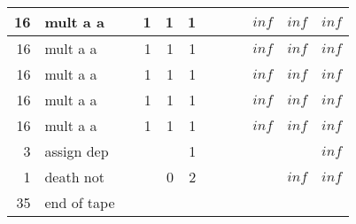 \documentclass{article}
\begin{document}
\begin{tabular}{|r|l|r|r|r|r||r|r||r|r|r|r|}
16 & mult a a & & 1 & 1 & 1 & & & &$ inf $&$ inf $&$ inf $\\ \hline 
16 & mult a a & & 1 & 1 & 1 & & & &$ inf $&$ inf $&$ inf $\\ \hline 
16 & mult a a & & 1 & 1 & 1 & & & &$ inf $&$ inf $&$ inf $\\ \hline 
16 & mult a a & & 1 & 1 & 1 & & & &$ inf $&$ inf $&$ inf $\\ \hline 
16 & mult a a & & 1 & 1 & 1 & & & &$ inf $&$ inf $&$ inf $\\ \hline 
3 & assign dep & & & & 1 & & & & & &$ inf $\\ \hline 
1 & death not & & & 0 & 2 & & & & &$ inf $&$ inf $\\ \hline 
 35 & end of tape & & & & & & & & & &  \\ \hline 
\end{tabular}
\end{document}
